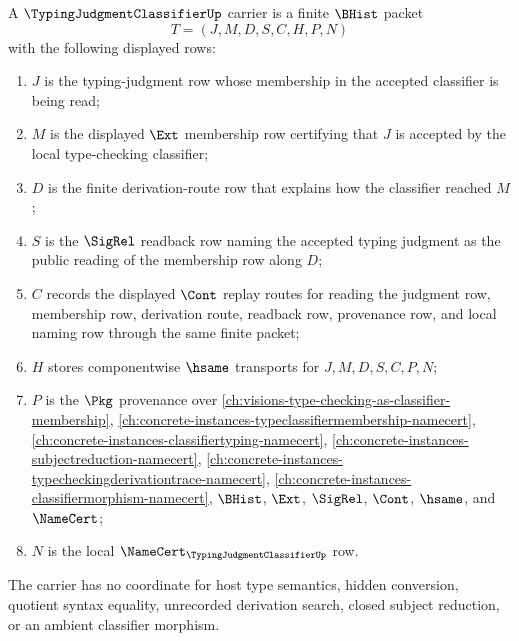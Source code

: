 \begin{definition}
\label{def:typing-judgment-classifier-carrier}
A $\TypingJudgmentClassifierUp$ carrier is a finite $\BHist$ packet
$$
T=(J,M,D,S,C,H,P,N)
$$
with the following displayed rows:
\begin{enumerate}
\item $J$ is the typing-judgment row whose membership in the accepted classifier is being read;
\item $M$ is the displayed $\Ext$ membership row certifying that $J$ is accepted by the local type-checking classifier;
\item $D$ is the finite derivation-route row that explains how the classifier reached $M$;
\item $S$ is the $\SigRel$ readback row naming the accepted typing judgment as the public reading of the membership row along $D$;
\item $C$ records the displayed $\Cont$ replay routes for reading the judgment row, membership row, derivation route, readback row, provenance row, and local naming row through the same finite packet;
\item $H$ stores componentwise $\hsame$ transports for $J,M,D,S,C,P,N$;
\item $P$ is the $\Pkg$ provenance over \autoref{ch:visions-type-checking-as-classifier-membership}, \autoref{ch:concrete-instances-typeclassifiermembership-namecert}, \autoref{ch:concrete-instances-classifiertyping-namecert}, \autoref{ch:concrete-instances-subjectreduction-namecert}, \autoref{ch:concrete-instances-typecheckingderivationtrace-namecert}, \autoref{ch:concrete-instances-classifiermorphism-namecert}, $\BHist$, $\Ext$, $\SigRel$, $\Cont$, $\hsame$, and $\NameCert$;
\item $N$ is the local $\NameCert_{\TypingJudgmentClassifierUp}$ row.
\end{enumerate}
The carrier has no coordinate for host type semantics, hidden conversion, quotient syntax equality, unrecorded derivation search, closed subject reduction, or an ambient classifier morphism.
\end{definition}

